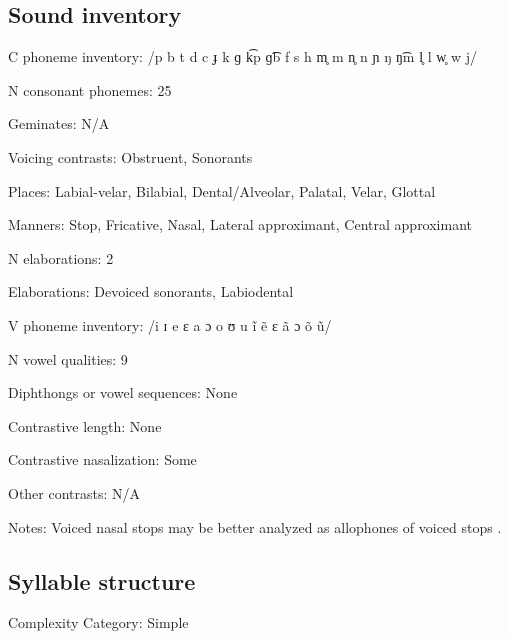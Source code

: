 {\subsection*{Sound inventory}
\begin{appendixdesc}

\item[C phoneme inventory:] /p b t d c ɟ k ɡ k͡p ɡ͡b f s h m̥ m n̥ n ɲ ŋ ŋ͡m l̥ l w̥ w j/

\item[N consonant phonemes:] 25

\item[Geminates:] N/A

\item[Voicing contrasts:] Obstruent, Sonorants

\item[Places:] Labial-velar, Bilabial, Dental/Alveolar, Palatal, Velar, Glottal

\item[Manners:] Stop, Fricative, Nasal, Lateral approximant, Central approximant

\item[N elaborations:] 2

\item[Elaborations:] Devoiced sonorants, Labiodental

\item[V phoneme inventory:] /i ɪ e ɛ a ɔ o ʊ u ĩ ẽ ɛ ã ɔ õ ũ/

\item[N vowel qualities:] 9

\item[Diphthongs or vowel sequences:] None

\item[Contrastive length:] None

\item[Contrastive nasalization:] Some

\item[Other contrasts:] N/A

\item[Notes:] Voiced nasal stops may be better analyzed as allophones of voiced stops \citep[176]{Newman1986}.
\end{appendixdesc}
\subsection*{Syllable structure}
\begin{appendixdesc}

\item[Complexity Category:] Simple


\end{appendixdesc}}
